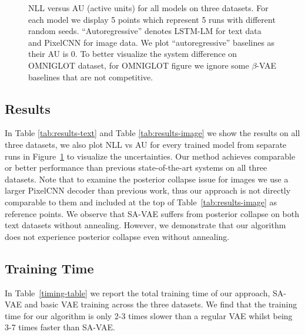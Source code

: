 \documentclass{article} \usepackage{iclr2019_conference,times}
\begin{document}
\begin{figure}[!t]
\centering
    \vspace{-12pt}
\caption{NLL versus AU (active units) for all models on three datasets. For each model we display 5 points which represent 5 runs with different random seeds. ``Autoregressive'' denotes LSTM-LM for text data and PixelCNN for image data. We plot ``autoregressive'' baselines as their AU is 0. To better visualize the system difference on OMNIGLOT dataset, for OMNIGLOT figure we ignore some $\beta$-VAE baselines that are not competitive.\label{fig:uncertain}}
\end{figure}

\subsection{Results}
In Table \ref{tab:results-text} and Table \ref{tab:results-image} we show the results on all three datasets, we also plot NLL vs AU for every trained model from separate runs in Figure~\ref{fig:uncertain} to visualize the uncertainties. Our method achieves comparable or better performance than previous state-of-the-art systems on all three datasets. Note that to examine the posterior collapse issue for images we use a larger PixelCNN decoder than previous work, thus our approach is not directly comparable to them and included at the top of Table~\ref{tab:results-image} as reference points. We observe that SA-VAE suffers from posterior collapse on both text datasets without annealing. However, we demonstrate that our algorithm does not experience posterior collapse even without annealing.







\subsection{Training Time}
In Table~\ref{timing-table} we report the total training time of our approach, SA-VAE and basic VAE training across the three datasets. We find that the training time for our algorithm is only 2-3 times slower than a regular VAE whilst being 3-7 times faster than SA-VAE. 
\end{document}
